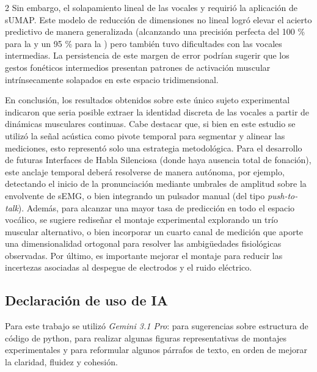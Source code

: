\documentclass[11pt, letterpaper]{article}
\renewcommand{\bibfont}{\normalfont\normalsize} %
\begin{document}
\begin{multicols*}{2}
Sin embargo, el solapamiento lineal de las vocales  y  requirió la aplicación de sUMAP. Este modelo de reducción de dimensiones no lineal logró elevar el acierto predictivo de manera generalizada (alcanzando una precisión perfecta del 100 \% para la  y un 95 \% para la ) pero también tuvo dificultades con las vocales intermedias. La persistencia de este margen de error podrían sugerir que los gestos fonéticos intermedios presentan patrones de activación muscular intrínsecamente solapados en este espacio tridimensional.

En conclusión, los resultados obtenidos sobre este único sujeto experimental indicaron que seria posible extraer la identidad discreta de las vocales a partir de dinámicas musculares continuas. Cabe destacar que, si bien en este estudio se utilizó la señal acústica como pivote temporal para segmentar y alinear las mediciones, esto representó solo una estrategia metodológica. Para el desarrollo de futuras Interfaces de Habla Silenciosa (donde haya ausencia total de fonación), este anclaje temporal deberá resolverse de manera autónoma, por ejemplo, detectando el inicio de la pronunciación mediante umbrales de amplitud sobre la envolvente de sEMG, o bien integrando un pulsador manual (del tipo \textit{push-to-talk}). Además, para alcanzar una mayor tasa de predicción en todo el espacio vocálico, se sugiere rediseñar el montaje experimental explorando un trío muscular alternativo, o bien incorporar un cuarto canal de medición que aporte una dimensionalidad ortogonal para resolver las ambigüedades fisiológicas observadas. Por último, es importante mejorar el montaje para reducir las incertezas asociadas al despegue de electrodos y el ruido eléctrico.

\subsection*{Declaración de uso de IA}

Para este trabajo se utilizó \textit{Gemini 3.1 Pro}: para sugerencias sobre estructura de código de python, para realizar algunas figuras representativas de montajes experimentales y para reformular algunos párrafos de texto, en orden de mejorar la claridad, fluidez y cohesión.


\begingroup
    \raggedright  %
    \renewcommand{\bibfont}{\small}
    \printbibliography
\endgroup

\end{multicols*}
\end{document}
